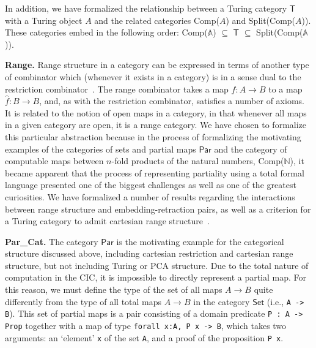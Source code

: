 \documentclass{entcs} \usepackage{entcsmacro}
\begin{document}
	

In addition, we have formalized the relationship between a Turing category $\mathsf{T}$ with a Turing object $A$ and the related categories Comp($A$) and Split(Comp($A$)). These categories embed in the following order:
Comp($\mathbb{A}$) $\subseteq$ $\mathsf{T}$ $\subseteq$ Split(Comp($\mathbb{A}$)).

{\bfseries Range.} Range structure in a category can be expressed in terms of another type of combinator which (whenever it exists in a category) is in a sense dual to the restriction combinator~\cite{RangeI}. The range combinator takes a map $f : A \to B$ to a map $\hat{f} : B \to B$, and, as with the restriction combinator, satisfies a number of axioms. It is related to the notion of open maps in a category, in that whenever all maps in a given category are open, it is a range category. We have chosen to formalize this particular abstraction because in the process of formalizing the motivating examples of the categories of sets and partial maps $\mathsf{Par}$ and the category of computable maps between $n$-fold products of the natural numbers, Comp($\mathbb{N}$), it became apparent that the process of representing partiality using a total formal language presented one of the biggest challenges as well as one of the greatest curiosities. We have formalized a number of results regarding the interactions between range structure and embedding-retraction pairs, as well as a criterion for a Turing category to admit cartesian range structure~\cite{MyThesis}.

{\bfseries Par\_Cat.} The category $\mathsf{Par}$ is the motivating example for the categorical structure discussed above, including cartesian restriction and cartesian range structure, but not including Turing or PCA structure. Due to the total nature of computation in the CIC, it is impossible to directly represent a partial map. For this reason, we must define the type of the set of all maps $A \to B$ quite differently from the type of all total maps $A \to B$ in the category $\mathsf{Set}$ (i.e., {\tt A -> B}). This set of partial maps is a pair consisting of a domain predicate {\tt P : A -> Prop} together with a map of type {\tt forall x:A, P x -> B}, which takes two arguments: an `element' {\tt x} of the set {\tt A}, and a proof of the proposition {\tt P x}. 
\end{document}
